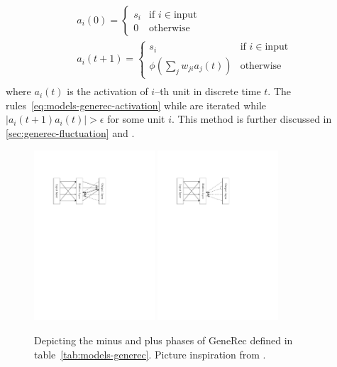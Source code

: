 \begin{align}
  \label{eq:models-generec-activation}
  a_i(0) = \left\{
	\begin{array}{ll}
		s_i & \mbox{if } i \in \mbox{input} \nonumber \\
		0 & \mbox{otherwise} \nonumber 
	\end{array}
\right. \\
  a_i(t+1) = \left\{
	\begin{array}{ll}
		s_i & \mbox{if } i \in \mbox{input} \nonumber \\
		\phi(\sum_j w_{ji}a_j(t)) & \mbox{otherwise} \nonumber 
	\end{array}
\right. \\
\end{align} 
where $a_i(t)$ is the activation of $i$--th unit in discrete time $t$. The rules~\ref{eq:models-generec-activation} while are iterated while $|a_i(t+1) a_i(t)| > \epsilon$ for some unit $i$. This method is further discussed in \ref{sec:generec-fluctuation} and \citep{orru2008sabio}.

\begin{figure}[H]
  \centering
  \includegraphics[width=0.4\textwidth]{img/models-generec-minus-phase.pdf}
  \includegraphics[width=0.4\textwidth]{img/models-generec-plus-phase.pdf}
  \caption{Depicting the minus and plus phases of GeneRec defined in table~\ref{tab:models-generec}. Picture inspiration from \citet{orru2008sabio}.} 
  \label{fig:models-generec-phase}
\end{figure}

